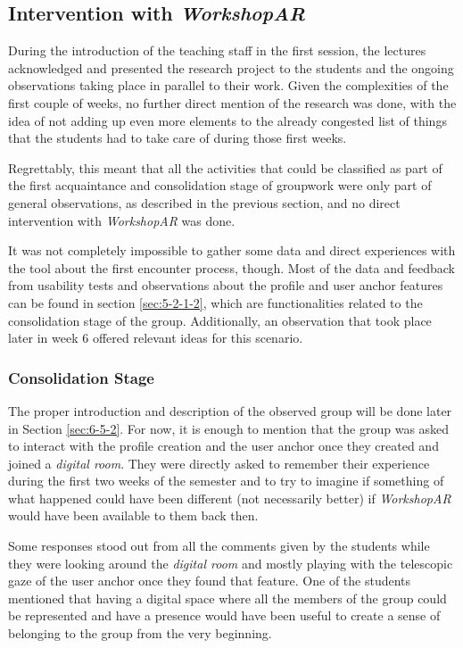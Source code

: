 \subsection{Intervention with \emph{WorkshopAR} \label{sec:6-4-2}}

During the introduction of the teaching staff in the first session, the lectures acknowledged and presented the research project to the students and the ongoing
observations taking place in parallel to their work. Given the complexities of the first couple of weeks, no further direct mention of the research was done, with the idea
of not adding up even more elements to the already congested list of things that the students had to take care of during those first weeks.

Regrettably, this meant that all the activities that could be classified as part of the first acquaintance and consolidation stage of groupwork \parencite{lowe_1982} were
only part of general observations, as described in the previous section, and no direct intervention with \emph{WorkshopAR} was done.

It was not completely impossible to gather some data and direct experiences with the tool about the first encounter process, though. Most of the data and feedback from
usability tests and observations about the profile and user anchor features can be found in section \ref{sec:5-2-1-2}, which are functionalities related to the
consolidation stage of the group. Additionally, an observation that took place later in week 6 offered relevant ideas for this scenario.

\subsubsection{Consolidation Stage \label{sec:6-4-2-1}}

The proper introduction and description of the observed group will be done later in Section \ref{sec:6-5-2}. For now, it is enough to mention that the group was asked to
interact with the profile creation and the user anchor once they created and joined a \emph{digital room}. They were directly asked to remember their experience during the
first two weeks of the semester and to try to imagine if something of what happened could have been different (not necessarily better) if \emph{WorkshopAR} would have been
available to them back then.

Some responses stood out from all the comments given by the students while they were looking around the \emph{digital room} and mostly playing with the telescopic gaze of
the user anchor once they found that feature. One of the students mentioned that having a digital space where all the members of the group could be represented and have a
presence would have been useful to create a sense of belonging to the group from the very beginning.

